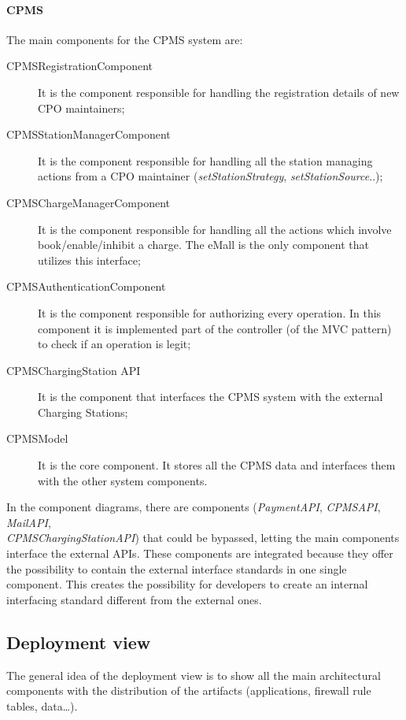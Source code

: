 \paragraph{\textbf{\ac{CPMS}}}
The main components for the \ac{CPMS} system are:
\begin{description}
    \item [\label{CPMSRegistrationComponent}CPMSRegistrationComponent] It is the component responsible for handling the registration details of new \ac{CPO} maintainers;
    \item [\label{CPMSStationManagerComponent}CPMSStationManagerComponent] It is the component responsible for handling all the station managing actions from a \ac{CPO} maintainer (\textit{setStationStrategy}, \textit{setStationSource}..);
    \item [\label{CPMSChargeManagerComponent}CPMSChargeManagerComponent] It is the component responsible for handling all the actions which involve book/enable/inhibit a charge. The \ac{eMall} is the only component that utilizes this interface;
    \item [\label{CPMSAuthenticationComponent}CPMSAuthenticationComponent] It is the component responsible for authorizing every operation. In this component it is implemented part of the controller (of the \ac{MVC} pattern) to check if an operation is legit;
    \item [\label{CPMSChargingStationAPI}CPMSChargingStation API] It is the component that interfaces the \ac{CPMS} system with the external Charging Stations;
    \item [\label{CPMSModel}CPMSModel] It is the core component. It stores all the \ac{CPMS} data and interfaces them with the other system components.
\end{description}
In the component diagrams, there are components (\textit{Payment\ac{API}}, \textit{\ac{CPMS}\ac{API}}, \textit{Mail\ac{API}}, \\\textit{\ac{CPMS}ChargingStationAPI}) that could be bypassed, letting the main components interface the external \acp{API}. These components are integrated because they offer the possibility to contain the external interface standards in one single component. This creates the possibility for developers to create an internal interfacing standard different from the external ones.

\subsection{Deployment view}
The general idea of the deployment view is to show all the main architectural components with the distribution of the artifacts (applications, firewall rule tables, data\ldots).

